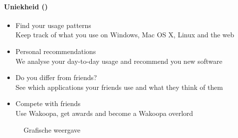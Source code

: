 \paragraph{Uniekheid (\citet{Beenen2004})}
\begin{itemize}
    \item{Find your usage patterns\\
      Keep track of what you use on Windows, Mac OS X, Linux and the web}

    \item{Personal recommendations\\
      We analyse your day-to-day usage and recommend you new software}

    \item{Do you differ from friends?\\
      See which applications your friends use and what they think of them}

    \item{Compete with friends\\
      Use Wakoopa, get awards and become a Wakoopa overlord}
\end{itemize}

    \begin{figure}
      \begin{center}
      \caption{Grafische weergave}
      \end{center}
    \end{figure}

